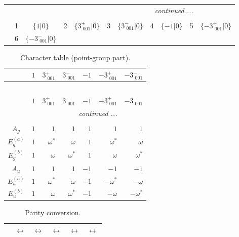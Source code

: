 \documentclass[fleqn,10pt,landscape]{article}
\begin{document}
\begin{itemize}
\begin{center}
\begin{longtable}{c|cc|cc|cc|cc|cc}
 \hline \hline
\multicolumn{10}{r}{\footnotesize\it continued ...} \\ \endfoot

 \hline \hline
\multicolumn{10}{r}{} \\ \endlastfoot

 & 1 & $\{1|0\}$ & 2 & $\{3^{+}_{\,\,001}|0\}$ & 3 & $\{3^{-}_{\,\,001}|0\}$ & 4 & $\{-1|0\}$ & 5 & $\{-3^{+}_{\,\,001}|0\}$ \\
& 6 & $\{-3^{-}_{\,\,001}|0\}$ &  &  &  &  &  &  &  &  \\
\end{longtable}
\end{center}
\begin{center}
\renewcommand{\arraystretch}{1.0}
\begin{longtable}{c|rrrrrr}
\caption{Character table (point-group part).}
 \\
 \hline \hline
 & $ 1 $ & $ 3^{+}_{\,\,001} $ & $ 3^{-}_{\,\,001} $ & $ -1 $ & $ -3^{+}_{\,\,001} $ & $ -3^{-}_{\,\,001} $ \\ \hline \endfirsthead

\multicolumn{6}{l}{\tablename\ \thetable{}} \\
 \hline \hline
 & $ 1 $ & $ 3^{+}_{\,\,001} $ & $ 3^{-}_{\,\,001} $ & $ -1 $ & $ -3^{+}_{\,\,001} $ & $ -3^{-}_{\,\,001} $ \\ \hline \endhead

 \hline \hline
\multicolumn{6}{r}{\footnotesize\it continued ...} \\ \endfoot

 \hline \hline
\multicolumn{6}{r}{} \\ \endlastfoot

$ A_{g} $ & $ 1 $ & $ 1 $ & $ 1 $ & $ 1 $ & $ 1 $ & $ 1 $ \\
$ E_{g}^{(a)} $ & $ 1 $ & $ \omega^{*} $ & $ \omega $ & $ 1 $ & $ \omega^{*} $ & $ \omega $ \\
$ E_{g}^{(b)} $ & $ 1 $ & $ \omega $ & $ \omega^{*} $ & $ 1 $ & $ \omega $ & $ \omega^{*} $ \\
$ A_{u} $ & $ 1 $ & $ 1 $ & $ 1 $ & $ -1 $ & $ -1 $ & $ -1 $ \\
$ E_{u}^{(a)} $ & $ 1 $ & $ \omega^{*} $ & $ \omega $ & $ -1 $ & $ - \omega^{*} $ & $ - \omega $ \\
$ E_{u}^{(b)} $ & $ 1 $ & $ \omega $ & $ \omega^{*} $ & $ -1 $ & $ - \omega $ & $ - \omega^{*} $ \\
\end{longtable}
\end{center}
\begin{center}
\renewcommand{\arraystretch}{1.0}
\begin{longtable}{cccccc}
\caption{Parity conversion.}
 \\
 \hline \hline
 & $\leftrightarrow$ & $\leftrightarrow$ & $\leftrightarrow$ & $\leftrightarrow$ & $\leftrightarrow$ \\ \hline \endfirsthead


\end{longtable}
\end{center}
\end{itemize}
\end{document}
